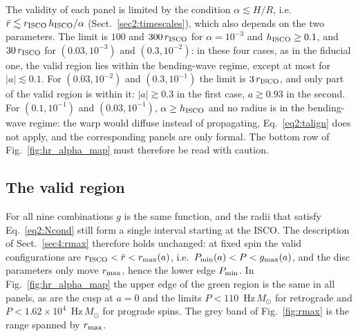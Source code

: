 The validity of each panel is limited by the condition $\alpha\lesssim H/R$, i.e.\ $\bar r\lesssim r_\textup{ISCO}\,h_\textup{ISCO}/\alpha$ (Sect.~\ref{sec2:timescales}), which also depends on the two parameters.
The limit is $100$ and $300\,r_\textup{ISCO}$ for $\alpha=10^{-3}$ and $h_\textup{ISCO}\geq0.1$, and $30\,r_\textup{ISCO}$ for $(0.03,10^{-3})$ and $(0.3,10^{-2})$: in these four cases, as in the fiducial one, the valid region lies within the bending-wave regime, except at most for $|a|\lesssim0.1$.
For $(0.03,10^{-2})$ and $(0.3,10^{-1})$ the limit is $3\,r_\textup{ISCO}$, and only part of the valid region is within it: $|a|\gtrsim0.3$ in the first case, $a\gtrsim0.93$ in the second.
For $(0.1,10^{-1})$ and $(0.03,10^{-1})$, $\alpha\geq h_\textup{ISCO}$ and no radius is in the bending-wave regime: the warp would diffuse instead of propagating, Eq.~\eqref{eq2:talign} does not apply, and the corresponding panels are only formal.
The bottom row of Fig.~\ref{fig:hr_alpha_map} must therefore be read with caution.

\subsection{The valid region}
\label{appA:general}

For all nine combinations $g$ is the same function, and the radii that satisfy Eq.~\eqref{eq2:Ncond} still form a single interval starting at the ISCO.
The description of Sect.~\ref{sec4:rmax} therefore holds unchanged: at fixed spin the valid configurations are $r_\textup{ISCO}<\bar r<r_\textup{max}(a)$, i.e.\ $P_\textup{min}(a)<P<g_\textup{max}(a)$, and the disc parameters only move $r_\textup{max}$, hence the lower edge $P_\textup{min}$.
In Fig.~\ref{fig:hr_alpha_map} the upper edge of the green region is the same in all panels, as are the cusp at $a=0$ and the limits $P<110$~Hz\,$M_\odot$ for retrograde and $P<1.62\times10^4$~Hz\,$M_\odot$ for prograde spins.
The grey band of Fig.~\ref{fig:rmax} is the range spanned by $r_\textup{max}$.

